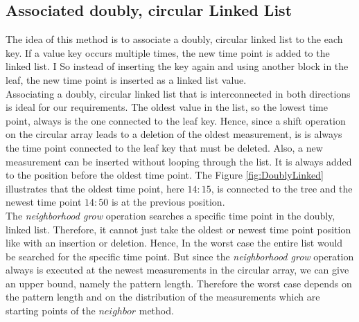 \documentclass[abstracton,12pt]{scrreprt}
\begin{document}
\subsection{Associated doubly, circular Linked List}
\label{doublyLinked}
The idea of this method is to associate a doubly, circular linked list to the each key. If a value key occurs multiple times, the new time point is added to the linked list.  I  So instead of inserting the key again and using another block in the leaf, the new time point is inserted as a linked list value.\\ 
Associating a doubly, circular linked list that is interconnected in both directions is ideal for our requirements. The oldest value in the list, so the lowest time point, always is the one connected to the leaf key. Hence, since a shift operation on the circular array leads to a deletion of the oldest measurement, is is always the  time point connected to the leaf key that must be deleted. Also, a new measurement can be inserted without looping through the list. It is always added to the position before the oldest time point. The Figure \ref{fig:DoublyLinked} illustrates that the oldest time point, here $14:15$, is connected to the tree and the newest time point $14:50$ is at the previous position.\\
The \emph{neighborhood grow} operation searches a specific time point in the doubly, linked list. Therefore, it cannot just take the oldest or newest time point position like with an insertion or deletion. Hence, In the worst case the entire list would be searched for the specific time point. But since the \emph{neighborhood grow} operation always is executed at the newest measurements in the circular array, we can give an upper bound, namely the pattern length. Therefore the worst case depends on the pattern length and on the distribution of the measurements which are  starting points of the $neighbor$ method.  
\end{document}

